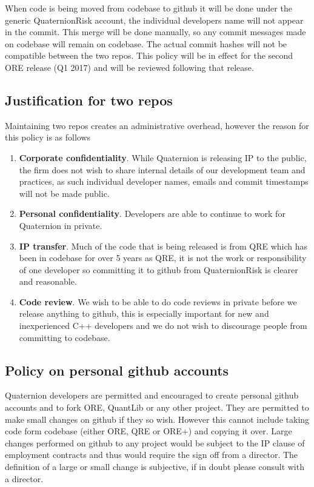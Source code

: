 \documentclass[12pt, a4paper]{article}
\begin{document}
When code is being moved from codebase to github it will be done under the generic QuaternionRisk account, the individual developers name will not appear in the commit. This merge will be done manually, so any commit messages made on codebase will remain on codebase. The actual commit hashes will not be compatible between the two repos.
This policy will be in effect for the second ORE release (Q1 2017) and will be reviewed following that release.

\subsection*{Justification for two repos}
Maintaining two repos creates an administrative overhead, however the reason for this policy is as follows
\begin{enumerate}
\item \textbf{Corporate confidentiality}. While Quaternion is releasing IP to the public, the firm does not wish to share internal details of our development team and practices, as such individual developer names, emails and commit timestamps will not be made public.
\item \textbf{Personal confidentiality}. Developers are able to continue to work for Quaternion in private.
\item \textbf{IP transfer}. Much of the code that is being released is from QRE which has been in codebase for over 5 years as QRE, it is not the work or responsibility of one developer so committing it to github from QuaternionRisk is clearer and reasonable.
\item \textbf{Code review}. We wish to be able to do code reviews in private before we release anything to github, this is especially important for new and inexperienced C++ developers and we do not wish to discourage people from committing to codebase.
\end{enumerate}


\subsection*{Policy on personal github accounts}
Quaternion developers are permitted and encouraged to create personal github accounts and to fork ORE, QuantLib or any other project. They are permitted to make small changes on github if they so wish. However this cannot include taking code form codebase (either ORE, QRE or ORE+) and copying it over. Large changes performed on github to any project would be subject to the IP clause of employment contracts and thus would require the sign off from a director. The definition of a large or small change is subjective, if in doubt please consult with a director. 
\end{document}
